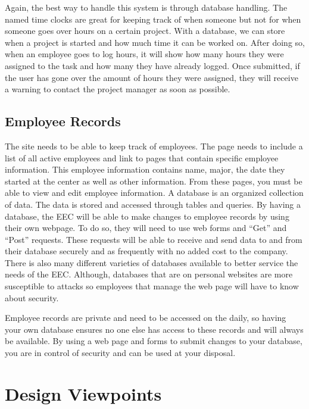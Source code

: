 \documentclass[letterpaper,10pt,titlepage,journal,compsoc,draftclsnofoot,onecolumn]{IEEEtran}
\begin{document}
\par Again, the best way to handle this system is through database handling. The named time clocks are great for keeping track of when someone but not for when someone goes over hours on a certain project. With a database, we can store when a project is started and how much time it can be worked on. After doing so, when an employee goes to log hours, it will show how many hours they were assigned to the task and how many they have already logged. Once submitted, if the user has gone over the amount of hours they were assigned, they will receive a warning to contact the project manager as soon as possible. 

\subsection{Employee Records}

\par The site needs to be able to keep track of employees. The page needs to include a list of  all active employees and link to pages that contain specific employee information. This employee information contains name, major, the date they started at the center as well as other information. From these pages, you must be able to view and edit employee information. A database is an organized collection of data. The data is stored and accessed through tables and queries. By having a database, the EEC will be able to make changes to employee records by using their own webpage. To do so, they will need to use web forms and “Get” and “Post” requests. These requests will be able to receive and send data to and from their database securely and as frequently with no added cost to the company. There is also many different varieties of databases available to better service the needs of the EEC. Although, databases that are on personal websites are more susceptible to attacks so employees that manage the web page will have to know about security. \newline

\par Employee records are private and need to be accessed on the daily, so having your own database ensures no one else has access to these records and will always be available. By using a web page and forms to submit changes to your database, you are in control of security and can be used at your disposal.

\section{Design Viewpoints}
\end{document}
